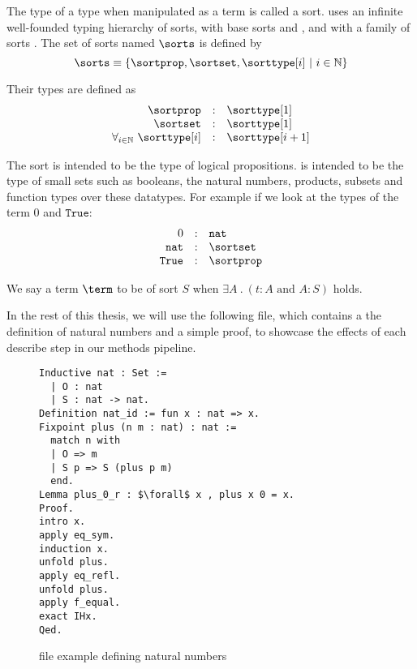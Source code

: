 \begin{definition}[sort]\label{def:sort}
	The type of a type when manipulated as a term is called a sort.
	\pcic uses an infinite well-founded typing hierarchy of sorts,
	with base sorts \sortprop and \sortset,
	and with a family of sorts \sorttype[{i}].
	The set of sorts named $\sorts$ is defined by
	\[\sorts \equiv \{ \sortprop, \sortset, \sorttype[{i}] ~|~ i \in \mathbb{N} \} \]

	Their types are defined as
	\[
		\begin{array}{rcl}
			\sortprop & : & \sorttype[1] \\
			\sortset & : & \sorttype[1] \\
			\forall_{i \in \mathbb{N}}~ \sorttype[i] & : & \sorttype[{i+1}]
		\end{array}
	\]
\end{definition}

The sort \sortprop is intended to be the type of logical propositions.
\sortset is intended to be the type of small sets such as booleans, the natural numbers, products, subsets and function types over these datatypes.
For example if we look at the types of the term $0$ and $\texttt{True}$:
	\[
		\begin{array}{rcl}
			0 & : & \texttt{nat} \\
			\texttt{nat} & : & \sortset \\
			\texttt{True} & : & \sortprop
		\end{array}
	\]

We say a term $\term$ to be of sort $S$ when $\exists A ~.~ (t : A \text{~and~} A : S)$ holds.

In the rest of this thesis, we will use the following \coq file, which contains a the definition
of natural numbers and a simple proof, to showcase the effects of each describe step in our methods pipeline.

\begin{figure}[H]
	\begin{lstlisting}[language=Coq, mathescape]
Inductive nat : Set :=
  | O : nat
  | S : nat -> nat.
Definition nat_id := fun x : nat => x.
Fixpoint plus (n m : nat) : nat :=
  match n with
  | O => m
  | S p => S (plus p m)
  end.
Lemma plus_0_r : $\forall$ x , plus x 0 = x.
Proof.
intro x.
apply eq_sym.
induction x.
unfold plus.
apply eq_refl.
unfold plus.
apply f_equal.
exact IHx.
Qed.
	\end{lstlisting}
	\caption{\coq file example defining natural numbers}
	\label{figure:natexample}
\end{figure}

